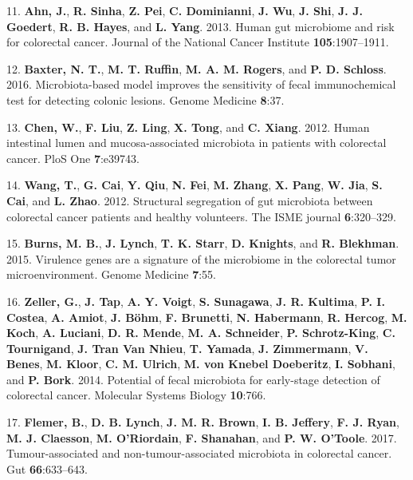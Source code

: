 \documentclass[12pt,]{article}
\begin{document}
\hypertarget{ref-ahn_human_2013}{}
11. \textbf{Ahn, J.}, \textbf{R. Sinha}, \textbf{Z. Pei}, \textbf{C.
Dominianni}, \textbf{J. Wu}, \textbf{J. Shi}, \textbf{J. J. Goedert},
\textbf{R. B. Hayes}, and \textbf{L. Yang}. 2013. Human gut microbiome
and risk for colorectal cancer. Journal of the National Cancer Institute
\textbf{105}:1907--1911.

\hypertarget{ref-baxter_microbiota-based_2016}{}
12. \textbf{Baxter, N. T.}, \textbf{M. T. Ruffin}, \textbf{M. A. M.
Rogers}, and \textbf{P. D. Schloss}. 2016. Microbiota-based model
improves the sensitivity of fecal immunochemical test for detecting
colonic lesions. Genome Medicine \textbf{8}:37.

\hypertarget{ref-chen_human_2012}{}
13. \textbf{Chen, W.}, \textbf{F. Liu}, \textbf{Z. Ling}, \textbf{X.
Tong}, and \textbf{C. Xiang}. 2012. Human intestinal lumen and
mucosa-associated microbiota in patients with colorectal cancer. PloS
One \textbf{7}:e39743.

\hypertarget{ref-wang_structural_2012}{}
14. \textbf{Wang, T.}, \textbf{G. Cai}, \textbf{Y. Qiu}, \textbf{N.
Fei}, \textbf{M. Zhang}, \textbf{X. Pang}, \textbf{W. Jia}, \textbf{S.
Cai}, and \textbf{L. Zhao}. 2012. Structural segregation of gut
microbiota between colorectal cancer patients and healthy volunteers.
The ISME journal \textbf{6}:320--329.

\hypertarget{ref-burns_virulence_2015}{}
15. \textbf{Burns, M. B.}, \textbf{J. Lynch}, \textbf{T. K. Starr},
\textbf{D. Knights}, and \textbf{R. Blekhman}. 2015. Virulence genes are
a signature of the microbiome in the colorectal tumor microenvironment.
Genome Medicine \textbf{7}:55.

\hypertarget{ref-zeller_potential_2014}{}
16. \textbf{Zeller, G.}, \textbf{J. Tap}, \textbf{A. Y. Voigt},
\textbf{S. Sunagawa}, \textbf{J. R. Kultima}, \textbf{P. I. Costea},
\textbf{A. Amiot}, \textbf{J. Böhm}, \textbf{F. Brunetti}, \textbf{N.
Habermann}, \textbf{R. Hercog}, \textbf{M. Koch}, \textbf{A. Luciani},
\textbf{D. R. Mende}, \textbf{M. A. Schneider}, \textbf{P.
Schrotz-King}, \textbf{C. Tournigand}, \textbf{J. Tran Van Nhieu},
\textbf{T. Yamada}, \textbf{J. Zimmermann}, \textbf{V. Benes},
\textbf{M. Kloor}, \textbf{C. M. Ulrich}, \textbf{M. von Knebel
Doeberitz}, \textbf{I. Sobhani}, and \textbf{P. Bork}. 2014. Potential
of fecal microbiota for early-stage detection of colorectal cancer.
Molecular Systems Biology \textbf{10}:766.

\hypertarget{ref-flemer_tumour-associated_2017}{}
17. \textbf{Flemer, B.}, \textbf{D. B. Lynch}, \textbf{J. M. R. Brown},
\textbf{I. B. Jeffery}, \textbf{F. J. Ryan}, \textbf{M. J. Claesson},
\textbf{M. O'Riordain}, \textbf{F. Shanahan}, and \textbf{P. W.
O'Toole}. 2017. Tumour-associated and non-tumour-associated microbiota
in colorectal cancer. Gut \textbf{66}:633--643.
\end{document}
